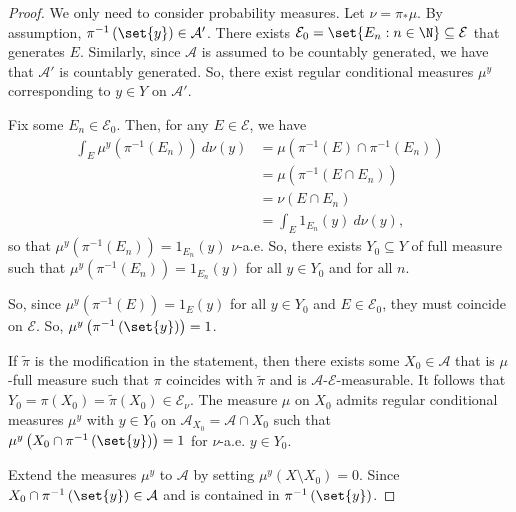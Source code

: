 \documentclass[10pt]{mypackage}
\begin{document}
\begin{proof}
  We only need to consider probability measures. Let $\nu = \pi_{\ast}\mu$. By assumption, $\pi^{-1}\left( \set{y} \right)\in \mathcal{A}'$. There exists $\mathcal{E}_0 = \set{E_n : n\in \N}\subseteq \mathcal{E}$ that generates $E$. Similarly, since $ \mathcal{A} $ is assumed to be countably generated, we have that $\mathcal{A}'$ is countably generated. So, there exist regular conditional measures $\mu^y$ corresponding to $y\in Y$ on $ \mathcal{A}' $. 

  Fix some $E_n\in \mathcal{E}_0$. Then, for any $E\in \mathcal{E}$, we have
  \begin{align*}
    \int_{E}^{} \mu^y\left( \pi^{-1}\left( E_n \right) \right)\:d\nu(y) &= \mu\left( \pi^{-1}\left( E \right)\cap \pi^{-1}\left( E_n \right) \right)\\
                                                                        &= \mu\left( \pi^{-1}\left( E\cap E_n \right) \right)\\
                                                                        &= \nu\left( E\cap E_n \right)\\
                                                                        &= \int_{E}^{} 1_{E_n}(y)\:d\nu(y),
  \end{align*}
  so that $\mu^y\left( \pi^{-1}\left( E_n \right) \right) = 1_{E_n}(y)$ $\nu$-a.e. So, there exists $Y_0\subseteq Y$ of full measure such that $\mu^y\left( \pi^{-1}\left( E_n \right) \right) = 1_{E_n}(y)$ for all $y\in Y_0$ and for all $n$.

  So, since $\mu^y\left( \pi^{-1}\left( E \right) \right) = 1_{E}\left( y \right)$ for all $y\in Y_0$ and $ E\in \mathcal{E}_0 $, they must coincide on $ \mathcal{E} $. So, $\mu^y\left( \pi^{-1}\left( \set{y} \right) \right) = 1$.

  If $ \widetilde{\pi} $ is the modification in the statement, then there exists some $X_0\in \mathcal{A}$ that is $\mu$-full measure such that $\pi$ coincides with $ \widetilde{\pi} $ and is $ \mathcal{A} $-$\mathcal{E}$-measurable. It follows that $Y_0 = \pi\left( X_0 \right) = \widetilde{\pi}\left( X_0 \right)\in \mathcal{E}_{\nu}$. The measure $\mu$ on $X_0$ admits regular conditional measures $\mu^y$ with $y\in Y_0$ on $ \mathcal{A}_{X_0} = \mathcal{A}\cap X_0 $ such that $\mu^y\left( X_0\cap \pi^{-1}\left( \set{y} \right) \right) = 1$ for $\nu$-a.e. $y\in Y_0$.

  Extend the measures $\mu^y$ to $ \mathcal{A} $ by setting $\mu^y\left( X\setminus X_0 \right) = 0$. Since $X_0\cap \pi^{-1}\left( \set{y} \right) \in \mathcal{A}$ and is contained in $\pi^{-1}\left( \set{y} \right)$.
\end{proof}
\end{document}
